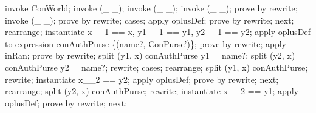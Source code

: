 \newpage
\begin{LPScript}\begin{zproof}[lPromotedConAuthNewPurseInjectivity]
    invoke ConWorld;
    invoke (\_ \finj \_);
    invoke (\_ \pinj \_);
    invoke (\_ \ffun \_);
    prove by rewrite;
    invoke (\_ \pfun \_);
    prove by rewrite;
    cases;
        apply oplusDef;
        prove by rewrite;
    next;
        rearrange;
        instantiate x\_\_1 == x, y1\_\_1 == y1, y2\_\_1 == y2;
        apply oplusDef to expression conAuthPurse \oplus \{(name?, \theta ConPurse')\};
        prove by rewrite;
        apply inRan;
        prove by rewrite;
        split (y1, x) \in conAuthPurse \land \lnot y1 = name?;
        split (y2, x) \in conAuthPurse \land \lnot y2 = name?;
        rewrite;
        cases;
            rearrange;
            split (y1, x) \in conAuthPurse;
            rewrite;
            instantiate x\_\_2 == y2;
            apply oplusDef;
            prove by rewrite;
        next;
            rearrange;
            split (y2, x) \in conAuthPurse;
            rewrite;
            instantiate x\_\_2 == y1;
            apply oplusDef;
            prove by rewrite;
    next;
\end{zproof}\end{LPScript}

